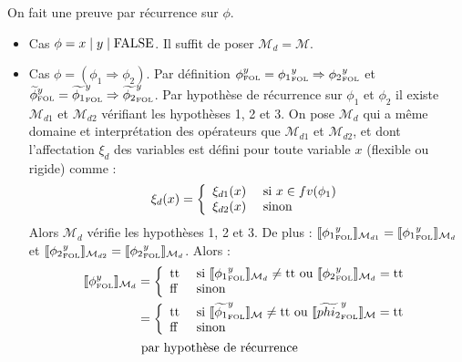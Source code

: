 \documentclass[12pt]{article}
\newcommand{\FOL}{\ensuremath{\textup{\tiny{}FOL}}}
\newcommand{\false}{\textup{ff}}
\newcommand{\true}{\textup{tt}}
\begin{document}
On fait une preuve par récurrence sur $\phi$.
\begin{itemize}
\item
  Cas $\phi = x \; | \; y \; | \; \textup{FALSE}$.
  Il suffit de poser $\mathcal{M}_d = \mathcal{M}$.
\item
  Cas $\phi = (\phi_1 \Rightarrow \phi_2)$.
  Par définition ${\phi}_\FOL^y = {\phi_1}_\FOL^y \Rightarrow {\phi_2}_\FOL^y$ et  $\widetilde{\phi}_\FOL^y = \widetilde{\phi_1}_\FOL^y \Rightarrow \widetilde{\phi_2}_\FOL^y$.
  Par hypothèse de récurrence sur $\phi_1$ et $\phi_2$ il existe $\mathcal{M}_{d1}$ et $\mathcal{M}_{d2}$ vérifiant les hypothèses 1, 2 et 3.
  On pose $\mathcal{M}_d$ qui a même domaine et interprétation des opérateurs que $\mathcal{M}_{d1}$ et $\mathcal{M}_{d2}$, et dont l'affectation $\xi_d$ des variables est défini pour toute variable $x$ (flexible ou rigide) comme :
  \[
    \xi_d(x) = \left \{
      \begin{array}{l l}
        \xi_{d1}(x) & \mbox{ si } x \in fv(\phi_1) \\
        \xi_{d2}(x) & \mbox{ sinon }
      \end{array}
    \right .
  \]
  Alors $\mathcal{M}_d$ vérifie les hypothèses 1, 2 et 3.
  De plus : $\llbracket {\phi_1}_\FOL^y \rrbracket_{\mathcal{M}_{d1}} = \llbracket {\phi_1}_\FOL^y \rrbracket_{\mathcal{M}_{d}}$
  et  $\llbracket {\phi_2}_\FOL^y \rrbracket_{\mathcal{M}_{d2}} = \llbracket {\phi_2}_\FOL^y \rrbracket_{\mathcal{M}_{d}}$.
  Alors : 
  \begin{align*}
    \llbracket \phi_\FOL^y \rrbracket_{\mathcal{M}_d}
    &= \left \{
      \begin{array}{l l}
        \true & \textup{ si }  \llbracket {\phi_1}_\FOL^y \rrbracket_{\mathcal{M}_d} \neq \true \textup{ ou } \llbracket {\phi_2}_\FOL^y \rrbracket_{\mathcal{M}_d} = \true \\
        \false & \textup{ sinon }
      \end{array}
             \right . \\
    &= \left \{
      \begin{array}{l l}
        \true & \textup{ si }  \llbracket {\widetilde{\phi_1}}_\FOL^y \rrbracket_{\mathcal{M}} \neq \true \textup{ ou } \llbracket {\widetilde{phi_2}}_\FOL^y \rrbracket_{\mathcal{M}} = \true \\
        \false & \textup{ sinon }
      \end{array}
             \right . \\
    & \textup{ par hypothèse de récurrence } \\

\end{align*}
\end{itemize}
\end{document}

